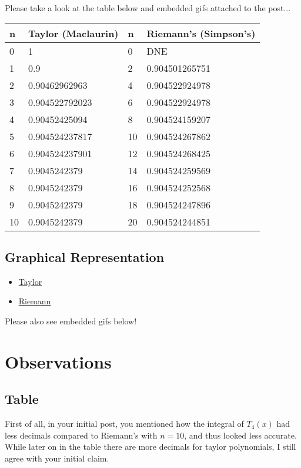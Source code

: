 \documentclass[12pt]{article}
\begin{document}
Please take a look at the table below and embedded gifs attached to the post...
\begin{table}[H]
  \begin{center}
    \begin{tabular}{|l|l|l|l|}
      \hline
      n  & Taylor (Maclaurin) & n  & Riemann's (Simpson's) \\ \hline
      0  & 1                  & 0  & DNE                   \\ \hline
      1  & 0.9                & 2  & 0.904501265751        \\ \hline
      2  & 0.90462962963      & 4  & 0.904522924978        \\ \hline
      3  & 0.904522792023     & 6  & 0.904522924978        \\ \hline
      4  & 0.90452425094      & 8  & 0.904524159207        \\ \hline
      5  & 0.904524237817     & 10 & 0.904524267862        \\ \hline
      6  & 0.904524237901     & 12 & 0.904524268425        \\ \hline
      7  & 0.9045242379       & 14 & 0.904524259569        \\ \hline
      8  & 0.9045242379       & 16 & 0.904524252568        \\ \hline
      9  & 0.9045242379       & 18 & 0.904524247896        \\ \hline
      10 & 0.9045242379       & 20 & 0.904524244851        \\ \hline
    \end{tabular}
  \end{center}
\end{table}
\subsection{Graphical Representation}
\begin{itemize}
  \item \href{https://www.desmos.com/calculator/coyobiwoqn}{Taylor}
  \item \href{https://www.desmos.com/calculator/4ivy2vkqny}{Riemann}
\end{itemize}

Please also see embedded gifs below!

\section{Observations}
\subsection{Table}
First of all, in your initial post, you mentioned how the integral of $T_{4}(x)$ had less decimals compared to Riemann's with $n=10$, and thus looked less accurate. While later on in the table there are more decimals for taylor polynomials, I still agree with your initial claim.
\end{document}
